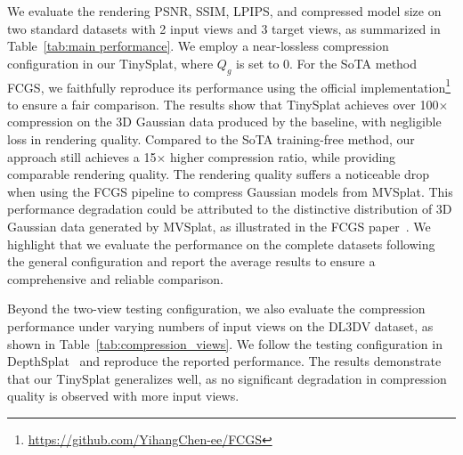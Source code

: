 \documentclass[lettersize,journal]{IEEEtran}
\begin{document}
We evaluate the rendering PSNR, SSIM, LPIPS, and compressed model size on two standard datasets with 2 input views and 3 target views, as summarized in Table~\ref{tab:main performance}. We employ a near-lossless compression configuration in our TinySplat, where $Q_g$ is set to 0. For the SoTA method FCGS, we faithfully reproduce its performance using the official implementation\footnote{\url{https://github.com/YihangChen-ee/FCGS}} to ensure a fair comparison. 
The results show that TinySplat achieves over 100$\times$ compression on the 3D Gaussian data produced by the baseline, with negligible loss in rendering quality. Compared to the SoTA training-free method, our approach still achieves a 15$\times$ higher compression ratio, while providing comparable rendering quality. 
The rendering quality suffers a noticeable drop when using the FCGS pipeline to compress Gaussian models from MVSplat. This performance degradation could be attributed to the distinctive distribution of 3D Gaussian data generated by MVSplat, as illustrated in the FCGS paper~\cite{chen2024fcgc}.
We highlight that we evaluate the performance on the complete datasets following the general configuration and report the average results to ensure a comprehensive and reliable comparison.

Beyond the two-view testing configuration, we also evaluate the compression performance under varying numbers of input views on the DL3DV dataset, as shown in Table~\ref{tab:compression_views}. We follow the testing configuration in DepthSplat~\cite{xu2024depthsplat} and reproduce the reported performance. The results demonstrate that our TinySplat generalizes well, as no significant degradation in compression quality is observed with more input views.
\end{document}
